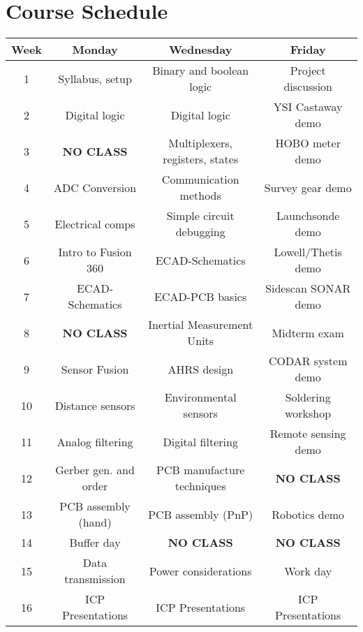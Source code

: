 \section*{Course Schedule}
\begin{table*}[h!]
    \begin{tabular}{ c | c | c | c }
        \toprule
        Week & Monday & Wednesday & Friday \\

        \midrule
        1   & Syllabus, setup       & Binary and boolean logic          & Project discussion    \\
        2   & Digital logic         & Digital logic                     & YSI Castaway demo     \\    
        3   & \textbf{NO CLASS}     & Multiplexers, registers, states   & HOBO meter demo       \\
        4   & ADC Conversion        & Communication methods             & Survey gear demo      \\
        5   & Electrical comps      & Simple circuit debugging          & Launchsonde demo      \\
        6   & Intro to Fusion 360   & ECAD-Schematics                   & Lowell/Thetis demo    \\
        7   & ECAD-Schematics       & ECAD-PCB basics                   & Sidescan SONAR demo   \\
        8   & \textbf{NO CLASS}     & Inertial Measurement Units        & Midterm exam          \\
        9   & Sensor Fusion         & AHRS design                       & CODAR system demo     \\
        10  & Distance sensors      & Environmental sensors             & Soldering workshop    \\
        11  & Analog filtering      & Digital filtering                 & Remote sensing demo   \\
        12  & Gerber gen. and order & PCB manufacture techniques        & \textbf{NO CLASS}     \\
        13  & PCB assembly (hand)   & PCB assembly (PnP)                & Robotics demo         \\
        14  & Buffer day            & \textbf{NO CLASS}                 & \textbf{NO CLASS}     \\
        15  & Data transmission     & Power considerations              & Work day              \\
        16  & ICP Presentations     & ICP Presentations                 & ICP Presentations     \\

        \bottomrule
    \end{tabular}
\end{table*}

